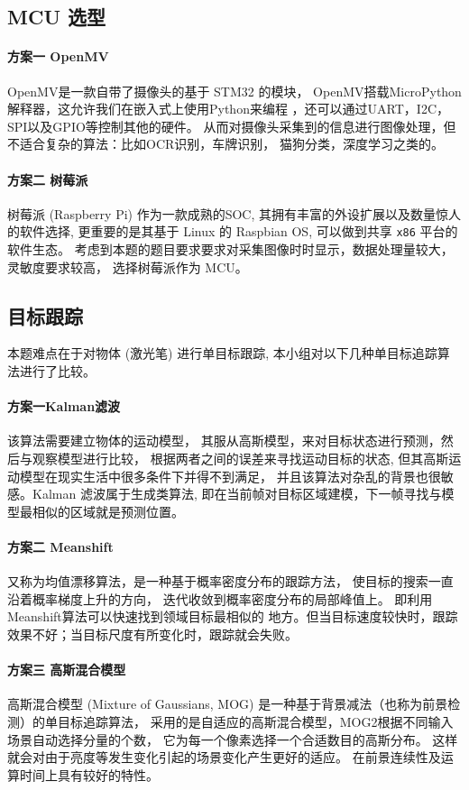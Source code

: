 \documentclass[scheme=chinese,a4paper]{article}
\begin{document}
\subsection{MCU 选型}

\paragraph{方案一 OpenMV} OpenMV是一款自带了摄像头的基于 STM32 的模块，
OpenMV搭载MicroPython解释器，这允许我们在嵌入式上使用Python来编程 ，还可以通过UART，I2C，SPI以及GPIO等控制其他的硬件。
从而对摄像头采集到的信息进行图像处理，但不适合复杂的算法：比如OCR识别，车牌识别，
猫狗分类，深度学习之类的。

\paragraph{方案二 树莓派}
树莓派 (Raspberry Pi) 作为一款成熟的SOC, 其拥有丰富的外设扩展以及数量惊人的软件选择, 更重要的是其基于 Linux 的
Raspbian OS, 可以做到共享 \lstinline{x86} 平台的软件生态。 
考虑到本题的题目要求要求对采集图像时时显示，数据处理量较大，灵敏度要求较高，
选择树莓派作为 MCU。 

\subsection{目标跟踪}
本题难点在于对物体 (激光笔) 进行单目标跟踪, 本小组对以下几种单目标追踪算法进行了比较。

\paragraph{方案一Kalman滤波}
该算法需要建立物体的运动模型，
其服从高斯模型，来对目标状态进行预测，然后与观察模型进行比较，
根据两者之间的误差来寻找运动目标的状态, 
但其高斯运动模型在现实生活中很多条件下并得不到满足，
并且该算法对杂乱的背景也很敏感。Kalman 滤波属于生成类算法, 
即在当前帧对目标区域建模，下一帧寻找与模型最相似的区域就是预测位置。
\paragraph{方案二 Meanshift}
又称为均值漂移算法，是一种基于概率密度分布的跟踪方法，
使目标的搜索一直沿着概率梯度上升的方向，
迭代收敛到概率密度分布的局部峰值上。
即利用Meanshift算法可以快速找到领域目标最相似的
地方。但当目标速度较快时，跟踪效果不好；当目标尺度有所变化时，跟踪就会失败。 
\paragraph{方案三 高斯混合模型}
高斯混合模型 (Mixture of Gaussians, MOG) 是一种基于背景减法（也称为前景检测）的单目标追踪算法，
采用的是自适应的高斯混合模型，MOG2根据不同输入场景自动选择分量的个数，
它为每一个像素选择一个合适数目的高斯分布。
这样就会对由于亮度等发生变化引起的场景变化产生更好的适应。
在前景连续性及运算时间上具有较好的特性。
\end{document}
